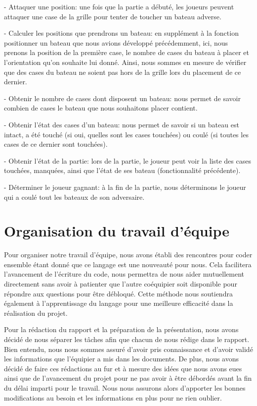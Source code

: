 \documentclass[12pt]{article}
\begin{document}
- Attaquer une position: une fois que la partie a débuté, les joueurs peuvent attaquer une case de la grille pour tenter de toucher un bateau adverse.

- Calculer les positions que prendrons un bateau: en supplément à la fonction positionner un bateau que nous avions développé précédemment, ici, nous prenons la position de la première case, le nombre de cases du bateau à placer et l'orientation qu'on souhaite lui donné. Ainsi, nous sommes en mesure de vérifier que des cases du bateau ne soient pas hors de la grille lors du placement de ce dernier.

- Obtenir le nombre de cases dont disposent un bateau: nous permet de savoir combien de cases le bateau que nous souhaitons placer contient.

- Obtenir l'état des cases d'un bateau: nous permet de savoir si un bateau est intact, a été touché (si oui, quelles sont les cases touchées) ou coulé (si toutes les cases de ce dernier sont touchées).

- Obtenir l'état de la partie: lors de la partie, le joueur peut voir la liste des cases touchées, manquées, ainsi que l'état de ses bateau (fonctionnalité précédente).

- Déterminer le joueur gagnant: à la fin de la partie, nous déterminons le joueur qui a coulé tout les bateaux de son adversaire.

\section{Organisation du travail d'équipe}

Pour organiser notre travail d'équipe, nous avons établi des rencontres pour coder ensemble étant donné que ce langage est une nouveauté pour nous. Cela facilitera l'avancement de l'écriture du code, nous permettra de nous aider mutuellement directement sans avoir à patienter que l'autre coéquipier soit disponible pour répondre aux questions pour être débloqué. Cette méthode nous soutiendra également à l'apprentissage du langage pour une meilleure efficacité dans la réalisation du projet.

Pour la rédaction du rapport et la préparation de la présentation, nous avons décidé de nous séparer les tâches afin que chacun de nous rédige dans le rapport. Bien entendu, nous nous sommes assuré d'avoir pris connaissance et d'avoir validé les informations que l'équipier a mis dans les documents. De plus, nous avons décidé de faire ces rédactions au fur et à mesure des idées que nous avons eues ainsi que de l'avancement du projet pour ne pas avoir à être débordés avant la fin du délai imparti pour le travail. Nous nous assurons alors d'apporter les bonnes modifications au besoin et les informations en plus pour ne rien oublier.
\end{document}
